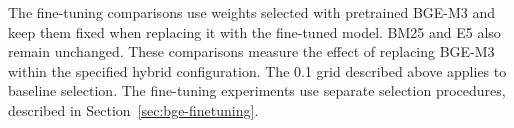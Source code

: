 The fine-tuning comparisons use weights selected with pretrained BGE-M3 and keep them fixed when replacing it with the fine-tuned model. BM25 and E5 also remain unchanged. These comparisons measure the effect of replacing BGE-M3 within the specified hybrid configuration. The 0.1 grid described above applies to baseline selection. The fine-tuning experiments use separate selection procedures, described in Section~\ref{sec:bge-finetuning}.
